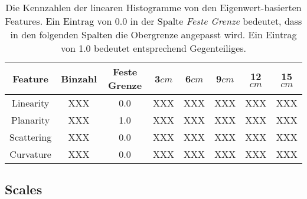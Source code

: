 \begin{table}
\centering
\begin{tabular}{c|c|c|c|c|c|c|c}
Feature & Binzahl & Feste Grenze & 3$cm$ & 6$cm$ & 9$cm$ & 12$cm$ & 15$cm$ \\
\hline
Linearity  & XXX & 0.0 & XXX & XXX & XXX & XXX & XXX \\
Planarity  & XXX & 1.0 & XXX & XXX & XXX & XXX & XXX \\
Scattering & XXX & 0.0 & XXX & XXX & XXX & XXX & XXX \\
Curvature  & XXX & 0.0 & XXX & XXX & XXX & XXX & XXX 
\end{tabular}
\caption{Die Kennzahlen der linearen Histogramme von den Eigenwert-basierten Features. Ein Eintrag von 0.0 in der Spalte \textit{Feste Grenze} bedeutet, dass in den folgenden Spalten die Obergrenze angepasst wird. Ein Eintrag von 1.0 bedeutet entsprechend Gegenteiliges.}
\label{table:eigenvalue_features_impl}
\end{table}

\subsection{Scales} 

